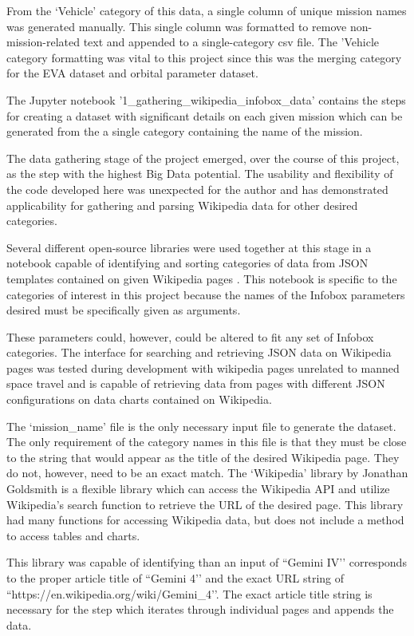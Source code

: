 \documentclass[sigconf]{acmart}
\begin{document}
From the ‘Vehicle’ category of this data, a single column of unique mission names was generated manually. This single column was formatted to remove non-mission-related text and appended to a single-category csv file. The 'Vehicle category formatting was vital to this project since this was the merging category for the EVA dataset and orbital parameter dataset.

The Jupyter notebook '1_gathering_wikipedia_infobox_data' contains the steps for creating a dataset with significant details on each given mission which can be generated from the a single category containing the name of the mission. 

The data gathering stage of the project emerged, over the course of this project, as the step with the highest Big Data potential. The usability and flexibility of the code developed here was unexpected for the author and has demonstrated applicability for gathering and parsing Wikipedia data for other desired categories.

Several different open-source libraries were used together at this stage in a notebook capable of identifying and sorting categories of data from JSON templates contained on given Wikipedia pages  \cite{stackoverflowquestions}. This notebook is specific to the categories of interest in this project because the names of the Infobox parameters desired must be specifically given as arguments. 

These parameters could, however, could be altered to fit any set of Infobox categories. The interface for searching and retrieving JSON data on Wikipedia pages was tested during development with wikipedia pages unrelated to manned space travel and is capable of retrieving data from pages with different JSON configurations on data charts contained on Wikipedia. 

The ‘mission_name’ file is the only necessary input file to generate the dataset. The only requirement of the category names in this file is that they must be close to the string that would appear as the title of the desired Wikipedia page. They do not, however, need to be an exact match. The `Wikipedia’ library by Jonathan Goldsmith \cite{Goldsmith2017} is a flexible library which can access the Wikipedia API and utilize Wikipedia’s search function to retrieve the URL of the desired page. This library had many functions for accessing Wikipedia data, but does not include a method to access tables and charts.

This library was capable of identifying than an input of ``Gemini IV’’ corresponds to the proper article title of ``Gemini 4’’ and the exact URL string of ``https://en.wikipedia.org/wiki/Gemini_4’’. The exact article title string is necessary for the step which iterates through individual pages and appends the data.
\end{document}
